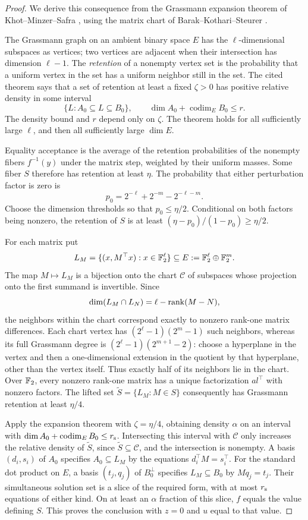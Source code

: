 \begin{proof}
We derive this consequence from the Grassmann expansion theorem of
Khot--Minzer--Safra \cite[Theorem~1.12 in the 2018 revision]{KMS23},
using the matrix chart of Barak--Kothari--Steurer
\cite[Definition~3.2 and Lemmas~3.3--3.7]{BKS18}.

The Grassmann graph on an ambient binary space $E$ has the
$\ell$-dimensional subspaces as vertices; two vertices are adjacent when
their intersection has dimension $\ell-1$.  The \emph{retention} of a
nonempty vertex set is the probability that a uniform vertex in the set
has a uniform neighbor still in the set.  The cited theorem says that a
set of retention at least a fixed $\zeta>0$ has positive relative
density in some interval
\[
 \{L:A_0\subseteq L\subseteq B_0\},
 \qquad \dim A_0+\operatorname{codim}_E B_0\le r.
\]
The density bound and $r$ depend only on $\zeta$.  The theorem holds for
all sufficiently large $\ell$, and then all sufficiently large
$\dim E$.

Equality acceptance is the average of the retention probabilities of the
nonempty fibers $f^{-1}(y)$ under the matrix step, weighted by their
uniform masses.  Some fiber $S$ therefore has retention at least $\eta$.
The probability that either perturbation factor is zero is
\[
 p_0=2^{-\ell}+2^{-m}-2^{-\ell-m}.
\]
Choose the dimension thresholds so that $p_0\le\eta/2$.  Conditional on
both factors being nonzero, the retention of $S$ is at least
$(\eta-p_0)/(1-p_0)\ge\eta/2$.

For each matrix put
\[
 L_M=\{(x,M^\top x):x\in\mathbb F_2^\ell\}
 \subseteq E:=\mathbb F_2^\ell\oplus\mathbb F_2^m.
\]
The map $M\mapsto L_M$ is a bijection onto the chart $\mathcal C$ of
subspaces whose projection onto the first summand is invertible.  Since
\[
 \dim(L_M\cap L_N)=\ell-\operatorname{rank}(M-N),
\]
the neighbors within the chart correspond exactly to nonzero rank-one
matrix differences.  Each chart vertex has
$(2^\ell-1)(2^m-1)$ such neighbors, whereas its full Grassmann degree is
$(2^\ell-1)(2^{m+1}-2)$: choose a hyperplane in the vertex and then a
one-dimensional extension in the quotient by that hyperplane, other than
the vertex itself.  Thus exactly
half of its neighbors lie in the chart.  Over $\mathbb F_2$, every nonzero
rank-one matrix has a unique factorization $a l^\top$ with nonzero
factors.  The lifted set $\widetilde S=\{L_M:M\in S\}$ consequently has
Grassmann retention at least $\eta/4$.

Apply the expansion theorem with $\zeta=\eta/4$, obtaining density
$\alpha$ on an interval with
$\dim A_0+\operatorname{codim}_E B_0\le r_{\rm s}$.  Intersecting
this interval with $\mathcal C$ only increases the relative density of
$\widetilde S$, since $\widetilde S\subseteq\mathcal C$, and the
intersection is nonempty.  A basis $(d_i,s_i)$ of $A_0$ specifies
$A_0\subseteq L_M$ by the equations $d_i^\top M=s_i^\top$.
For the standard dot product on $E$, a basis $(t_j,q_j)$ of
$B_0^\perp$ specifies $L_M\subseteq B_0$ by
$Mq_j=t_j$.  Their simultaneous solution set is a slice of the required
form, with at most $r_{\rm s}$ equations of either kind.  On at least an
$\alpha$ fraction of this slice, $f$ equals the value defining $S$.
This proves the conclusion with $z=0$ and $u$ equal to that value.


\end{proof}
